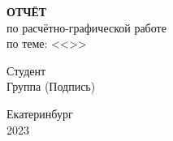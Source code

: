 \vfill

\begin{center}
    \textbf{ОТЧЁТ} \\
    по расчётно-графической работе \\
    по теме: <<\topicName>>
\end{center}

\vfill

\begin{flushleft}
    \begin{tabbing}
        Студент  \= \underline{\authorName} \hspace{5cm} \=  \\
        Группа \> \underline{\groupNumber} \> \footnotesize{(Подпись)} \\
    \end{tabbing}
\end{flushleft}

\vfill

\begin{center}
    Екатеринбург \\ 2023
\end{center}
